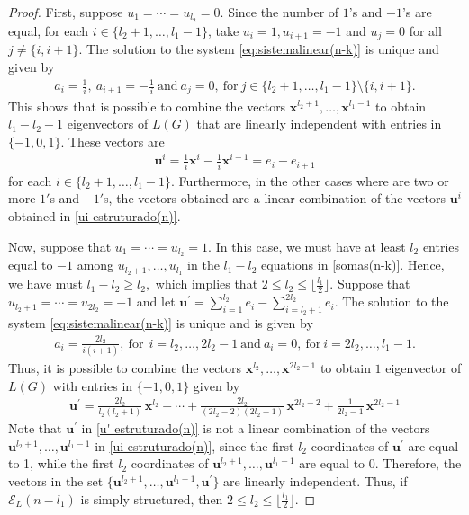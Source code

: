 \documentclass[10pt,a4paper]{amsart}
\begin{document}
\begin{proof}
First, suppose $u_1 = \cdots =u_{l_2} = 0.$ Since the number of $1$'s and $-1$'s are equal, for each $i \in \{l_2+1,\ldots,l_1-1\}$, take $u_{i} = 1, u_{i+1} = -1$ and $u_{j} = 0$ for all $j \ne \{i, i+1\}.$ The solution to the system \eqref{eq:sistemalinear(n-k)} is unique and given by 
\begin{align*}
    a_{i}=\frac{1}{i}, \ a_{i+1} = -\frac{1}{i} \ \text{and} \ a_{j}=0, \ \text{for} \  j \in \{l_2+1, \ldots, l_1-1\} \setminus \{i, i+1\}.    
\end{align*}
This shows that is possible to combine the vectors  $\mathbf{x}^{l_2+1},\ldots,\mathbf{x}^{l_1-1}$ to obtain $l_1-l_2-1$ eigenvectors of $L(G)$ that are linearly independent with entries in $\{-1,0,1\}$. These vectors are 
\begin{align}\label{ui estruturado(n)}
    \mathbf{u}^{i} = \frac{1}{i}\mathbf{x}^i-\frac{1}{i}\mathbf{x}^{i-1} = e_i-e_{i+1}
\end{align}
for each $i \in \{l_2+1,\ldots,l_1-1\}.$
Furthermore, in the other cases where are two or more $1'$s and $-1'$s, the vectors obtained are a linear combination of the vectors $\mathbf{u}^{i}$ obtained in \eqref{ui estruturado(n)}.

Now, suppose that $u_{1} = \cdots = u_{l_2} =1.$ In this case, we must have at least $l_2$ entries equal to $-1$ among $u_{l_2+1},\ldots,u_{l_1}$ in the $l_1-l_2$ equations in \eqref{somas(n-k)}. Hence, we have must $l_1 -l_2 \geq l_2,$ which implies that $2\leq l_2 \leq \lfloor \frac{l_1}{2} \rfloor.$ Suppose that $u_{l_2+1} = \cdots = u_{2l_2} =-1$ and let $\mathbf{u}^{\prime}=\sum_{i=1}^{l_2} e_i-\sum_{i=l_2+1}^{2l_2} e_{i}$. The solution to the system \eqref{eq:sistemalinear(n-k)} is unique and is given by 
\begin{align*}
    a_i=\frac{2l_2}{i(i+1)}, \ \text{for} \ \  i=l_2, \ldots, 2l_2-1 \ \text{and} \ a_i=0, \ \text{for} \ i=2l_2, \ldots, l_1-1.
\end{align*}
Thus, it is possible to combine the vectors $\mathbf{x}^{l_2},\ldots,\mathbf{x}^{2l_2-1}$ to obtain $1$ eigenvector of $L(G)$ with entries in $\{-1,0,1\}$ given by
\begin{align}\label{u' estruturado(n)}
    \mathbf{u}^{\prime}=\frac{2l_2}{l_2(l_2+1)} \, \mathbf{x}^{l_2} + \cdots + \frac{2l_2}{(2l_2-2)(2l_2-1)} \, \mathbf{x}^{2l_2-2} + \frac{1}{2l_2-1} \, \mathbf{x}^{2l_2-1}
\end{align}
Note that $\mathbf{u}^{\prime}$ in \eqref{u' estruturado(n)} is not a linear combination of the vectors  $\mathbf{u}^{l_2+1}, \ldots, \mathbf{u}^{l_1-1}$ in \eqref{ui estruturado(n)}, since the first $l_2$ coordinates of $\mathbf{u}^{\prime}$ are equal to 1, while the first $l_2$ coordinates of $\mathbf{u}^{l_2+1}, \ldots, \mathbf{u}^{l_1-1}$ are equal to 0. Therefore, the vectors in the set $\{\mathbf{u}^{l_2+1},\ldots,\mathbf{u}^{l_1-1}, \mathbf{u}^{\prime}\}$ are linearly independent. Thus, if $\mathcal{E}_L(n-l_1)$ is simply structured, then $2\leq l_2 \leq \lfloor \frac{l_1}{2} \rfloor.$


\end{proof}
\end{document}

